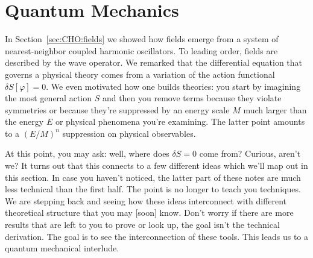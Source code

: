 
\chapter{Quantum Mechanics}

In Section~\ref{sec:CHO:fields} we showed how fields emerge from a system of nearest-neighbor coupled harmonic oscillators. To leading order, fields are described by the wave operator. We remarked that the differential equation that governs a physical theory comes from a variation of the action functional $\delta S[\varphi]=0$. We even motivated how one builds theories: you start by imagining the most general action $S$ and then you remove terms because they violate symmetries or because they're suppressed by an energy scale $M$ much larger than the energy $E$ or physical phenomena you're examining. The latter point amounts to a $(E/M)^n$ suppression on physical observables. 

At this point, you may ask: well, where does $\delta S = 0$ come from? Curious, aren't we? It turns out that this connects to a few different ideas which we'll map out in this section. In case you haven't noticed, the latter part of these notes are much less technical than the first half. The point is no longer to teach you techniques. We are stepping back and seeing how these ideas interconnect with different theoretical structure that you may [soon] know. Don't worry if there are more results that are left to you to prove or look up, the goal isn't the technical derivation. The goal is to see the interconnection of these tools.
% 
This leads us to a quantum mechanical interlude.


